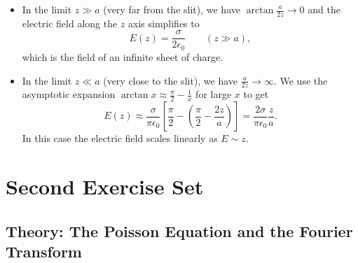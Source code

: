 \documentclass[11pt, a4paper]{article}
\newcommand{\ee}{\epsilon_{0}}  %
\begin{document}
\begin{itemize}
	\item In the limit $ z \gg a $ (very far from the slit), we have $ \arctan\frac{a}{2z} \to 0 $ and the electric field along the $ z $ axis simplifies to 
	\begin{equation*}
		E(z) = \frac{\sigma}{2 \ee} \qquad (z \gg a),
	\end{equation*}
	which is the field of an infinite sheet of charge.
	
	\item In the limit $ z \ll a $ (very close to the slit), we have $ \frac{a}{2z} \to \infty $. We use the asymptotic expansion $ \arctan x \approx \frac{\pi}{2} - \frac{1}{x} $ for large $ x $ to get
	\begin{equation*}
		E(z) \approx \frac{\sigma}{\pi \ee} \left[\frac{\pi}{2} - \left(\frac{\pi}{2} - \frac{2z}{a}\right)\right] = \frac{2\sigma}{\pi \ee} \frac{z}{a}.
	\end{equation*}
	In this case the electric field scales linearly as $ E \sim z $. 
\end{itemize} 


\newpage
\section{Second Exercise Set}
\subsection{Theory: The Poisson Equation and the Fourier Transform}
\end{document}
